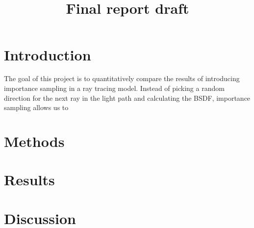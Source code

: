 \documentclass[12pt]{article}
\title{Final report draft}
\begin{document}
\maketitle
\begin{abstract}

\end{abstract}

\section{Introduction}
	The goal of this project is to quantitatively compare the results of introducing importance sampling in a ray tracing model. Instead of picking a random direction for the next ray in the light path and calculating the BSDF, importance sampling allows us to 
    
\section{Methods}



\section{Results}

\section{Discussion}
\end{document}
